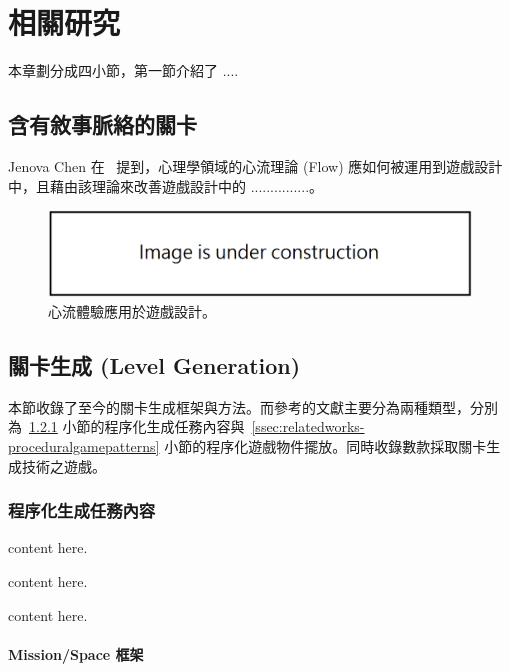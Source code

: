 \chapter{相關研究}
\label{cha:relatedworks}

本章劃分成四小節，第一節介紹了 ....



\section{含有敘事脈絡的關卡}
\label{sec:flow-in-games}

Jenova Chen 在~\cite{chen2007flow} 提到，心理學領域的心流理論 (Flow) 應如何被運用到遊戲設計中，且藉由該理論來改善遊戲設計中的 ...............。

\begin{figure}[h]
  \begin{center}
    \includegraphics[width=1.0\textwidth]{figures/under_construction.png}
    \caption{心流體驗應用於遊戲設計。} 
    \label{fig:flow-in-games}
  \end{center}
\end{figure}

\section{關卡生成 (Level Generation)}
\label{sec:relatedworks-levelgeneration}

本節收錄了至今的關卡生成框架與方法。而參考的文獻主要分為兩種類型，分別為~\ref{ssec:relatedworks-proceduralmission} 小節的程序化生成任務內容與~\ref{ssec:relatedworks-proceduralgamepatterns} 小節的程序化遊戲物件擺放。同時收錄數款採取關卡生成技術之遊戲。

\subsection{程序化生成任務內容}
\label{ssec:relatedworks-proceduralmission}

content here.

content here.

content here.

\subsubsection{Mission/Space 框架}
\label{sssec:relatedworks-proceduralmission-missionspace}

